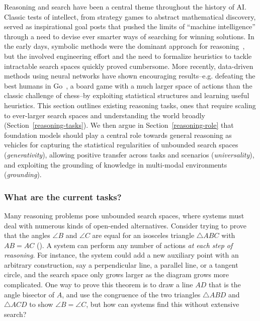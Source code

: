 Reasoning and search have been a central theme throughout the history of AI. Classic tests of intellect, from strategy games to abstract mathematical discovery, served as inspirational goal posts that pushed the limits of ``machine intelligence'' through a need to devise ever smarter ways of searching for winning solutions. In the early days, symbolic methods were the dominant approach for reasoning~\citep{DBLP:books/aw/RN2020}, but the involved engineering effort and the need to formalize heuristics to tackle intractable search spaces quickly proved cumbersome. More recently, data-driven methods using neural networks have shown encouraging results--e.g. defeating the best humans in Go~\citep{DBLP:journals/nature/SilverHMGSDSAPL16}, a board game with a much larger space of actions than the classic challenge of chess--by exploiting statistical structures and learning useful heuristics. This section outlines existing reasoning tasks, ones that require scaling to ever-larger search spaces and understanding the world broadly (Section~\ref{reasoning-tasks}).
We then argue in Section~\ref{reasoning-role} that foundation models should play a central role towards general reasoning as vehicles for capturing the statistical regularities of unbounded search spaces (\emph{generativity}), allowing positive transfer across tasks and scenarios (\emph{universality}), and exploiting the grounding of knowledge in multi-modal environments (\emph{grounding}). 

\subsubsection{What are the current tasks?}
\label{sec:reasoning-tasks}

Many reasoning problems pose unbounded search spaces, where systems must deal with numerous kinds of open-ended alternatives. Consider trying to prove that the angles $\angle B$ and $\angle C$ are equal for an isosceles triangle $\triangle ABC$ with $AB=AC$ (). A system can perform any number of actions \textit{at each step of reasoning}. For instance, the system could add a new auxiliary point with an arbitrary construction, say a perpendicular line, a parallel line, or a tangent circle, and the search space only grows larger as the diagram grows more complicated. One way to prove this theorem is to draw a line $AD$ that is the angle bisector of $A$, and use the congruence of the two triangles $\triangle ABD$ and $\triangle ACD$ to show $\angle B = \angle C$, but how can systems find this without extensive search?

